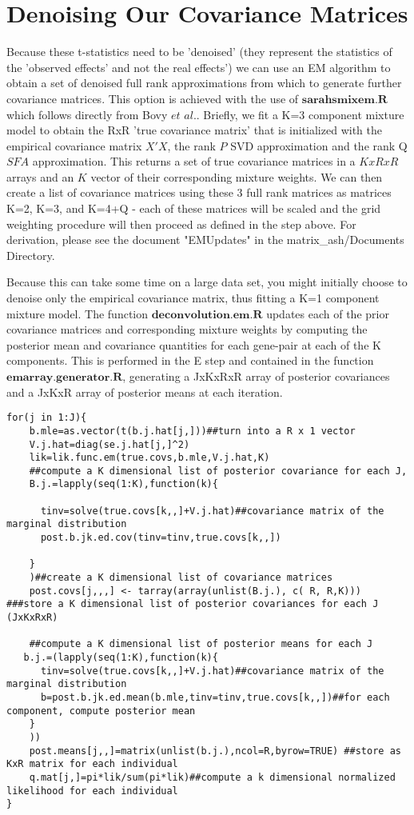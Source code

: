\documentclass[10pt]{article}
\newcommand{\etal}{\textit{et al.}} %
\begin{document}
\section{Denoising Our Covariance Matrices}
Because these t-statistics need to be 'denoised' (they represent the statistics of the 'observed effects' and not the real effects') we can use an EM algorithm to obtain a set of denoised full rank approximations from which to generate further covariance matrices. 
This option is achieved with the use of $\textbf{sarahsmixem.R}$ which follows directly from Bovy $\etal$. Briefly, we fit a K=3 component mixture model to obtain the RxR 'true covariance matrix' that is initialized with the empirical covariance matrix $X'X$, the rank $P$ SVD approximation and the rank Q $SFA$ approximation. This returns a set of true covariance matrices in a $KxRxR$ arrays and an $K$ vector of their corresponding mixture weights. We can then create a list of covariance matrices using these 3 full rank matrices as matrices K=2, K=3, and K=4+Q - each of these matrices will be scaled and the grid weighting procedure will then proceed as defined in the step above. For derivation, please see the document "EMUpdates" in the matrix_ash/Documents Directory.

Because this can take some time on a large data set, you might initially choose to denoise only the empirical covariance matrix, thus fitting a K=1 component mixture model. The function $\textbf{deconvolution.em.R}$ updates each of the prior covariance matrices and corresponding mixture weights by computing the posterior mean and covariance quantities for each gene-pair at each of the K components. This is performed in the E step and contained in the function $\textbf{emarray.generator.R}$, generating a JxKxRxR array of posterior covariances and a JxKxR array of posterior means at each iteration.

\begin{verbatim}
for(j in 1:J){
    b.mle=as.vector(t(b.j.hat[j,]))##turn into a R x 1 vector
    V.j.hat=diag(se.j.hat[j,]^2)
    lik=lik.func.em(true.covs,b.mle,V.j.hat,K)
    ##compute a K dimensional list of posterior covariance for each J, 
    B.j.=lapply(seq(1:K),function(k){
      
      tinv=solve(true.covs[k,,]+V.j.hat)##covariance matrix of the marginal distribution
      post.b.jk.ed.cov(tinv=tinv,true.covs[k,,])
        
    }
    )##create a K dimensional list of covariance matrices 
    post.covs[j,,,] <- tarray(array(unlist(B.j.), c( R, R,K))) ###store a K dimensional list of posterior covariances for each J (JxKxRxR) 
    
    ##compute a K dimensional list of posterior means for each J
   b.j.=(lapply(seq(1:K),function(k){
      tinv=solve(true.covs[k,,]+V.j.hat)##covariance matrix of the marginal distribution
      b=post.b.jk.ed.mean(b.mle,tinv=tinv,true.covs[k,,])##for each component, compute posterior mean
    }
    ))
    post.means[j,,]=matrix(unlist(b.j.),ncol=R,byrow=TRUE) ##store as KxR matrix for each individual
    q.mat[j,]=pi*lik/sum(pi*lik)##compute a k dimensional normalized likelihood for each individual 
}

\end{verbatim}
\end{document}
